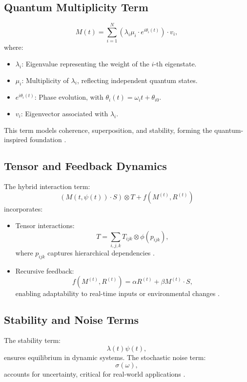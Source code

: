 \documentclass{article}
\theoremstyle{plain}
\begin{document}
\subsection{Quantum Multiplicity Term}
\begin{equation}
    M(t) = \sum_{i=1}^N (\lambda_i \mu_i \cdot e^{i \theta_i(t)}) \cdot v_i,
\end{equation}
where:
\begin{itemize}
    \item \(\lambda_i\): Eigenvalue representing the weight of the \(i\)-th eigenstate.
    \item \(\mu_i\): Multiplicity of \(\lambda_i\), reflecting independent quantum states.
    \item \(e^{i \theta_i(t)}\): Phase evolution, with \(\theta_i(t) = \omega_i t + \theta_{i0}\).
    \item \(v_i\): Eigenvector associated with \(\lambda_i\).
\end{itemize}
This term models coherence, superposition, and stability, forming the quantum-inspired foundation \cite{schuld2019quantum}.

\subsection{Tensor and Feedback Dynamics}
The hybrid interaction term:
\begin{equation}
    (M(t, \psi(t)) \cdot S) \otimes T + f(M^{(t)}, R^{(t)})
\end{equation}
incorporates:
\begin{itemize}
    \item Tensor interactions:
    \begin{equation}
        T = \sum_{i,j,k} T_{ijk} \otimes \phi(p_{ijk}),
    \end{equation}
    where \(p_{ijk}\) captures hierarchical dependencies \cite{tensor2023harmonics}.
    \item Recursive feedback:
    \begin{equation}
        f(M^{(t)}, R^{(t)}) = \alpha R^{(t)} + \beta M^{(t)} \cdot S,
    \end{equation}
    enabling adaptability to real-time inputs or environmental changes \cite{recursion2022feedback}.
\end{itemize}

\subsection{Stability and Noise Terms}
The stability term:
\begin{equation}
    \lambda(t) \psi(t),
\end{equation}
ensures equilibrium in dynamic systems. The stochastic noise term:
\begin{equation}
    \sigma(\omega),
\end{equation}
accounts for uncertainty, critical for real-world applications \cite{hinton2006reducing}.
\end{document}
